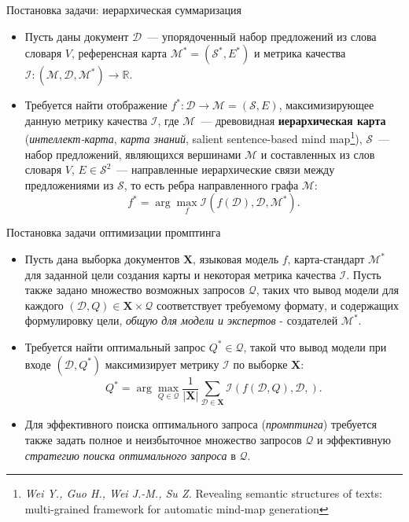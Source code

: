\documentclass{beamer}
\newcommand{\Q}{\mathcal{Q}}
\newcommand{\D}{\mathcal{D}}
\renewcommand{\S}{\mathcal{S}}
\newcommand{\X}{\mathbf{X}}
\newcommand{\I}{\mathcal{I}}
\newcommand{\M}{\mathcal{M}}
\newcommand{\R}{\mathbb{R}}
\begin{document}

\begin{frame}{Постановка задачи: иерархическая суммаризация}

\begin{itemize}
    \item Пусть даны документ $\D$~--- упорядоченный набор предложений из слова словаря $V$, референсная карта $\M^* = (\S^*, E^*)$ и метрика качества $\I: (\M, \D, \M^*) \rightarrow \R$.
    \item Требуется найти отображение $f^*: \D \rightarrow \M = (\S, E)$, максимизирующее данную метрику качества $\I$, где $\M$~--- древовидная \textbf{иерархическая карта} (\textit{интеллект-карта}, \textit{карта знаний}, salient sentence-based mind map\footnote{
    \emph{Wei Y., Guo H., Wei J.-M., Su Z.} Revealing semantic structures of texts: multi-grained framework for automatic mind-map generation
    }), $\S$~--- набор предложений, являющихся вершинами $\M$ и составленных из слов словаря $V$, $E\in \S^2$~--- направленные иерархические связи между предложениями из $\S$, то есть ребра направленного графа $\M$:
$$
f^* = \arg\max\limits_{f} \I(f(\D), \D, \M^*).
$$
\end{itemize}

\end{frame}


\begin{frame}{Постановка задачи оптимизации промптинга}

\begin{itemize}
    \item Пусть дана выборка документов $\X$, языковая модель $f$, карта-стандарт $\M^*$ для заданной цели создания карты и некоторая метрика качества $\I$. Пусть также задано множество возможных запросов $\Q$, таких что вывод модели для каждого $(\D, Q)\in\X\times\Q$ соответствует требуемому формату, и содержащих формулировку цели, \textit{общую для модели и экспертов} - создателей $\M^*$.
    \item Требуется найти оптимальный запрос $Q^*\in\Q$, такой что вывод модели при входе $(\D, Q^*)$ максимизирует метрику $\I$ по выборке $\X$:
    $$
    Q^* = \arg\max\limits_{Q\in\Q} \frac{1}{|\X|}\sum\limits_{\D\in\X} \I(f(\D, Q), \D, ).
    $$
    \item Для эффективного поиска оптимального запроса (\textit{промптинга}) требуется также задать полное и неизбыточное множество запросов $\Q$ и эффективную \textit{стратегию поиска оптимального запроса} в $\Q$.
\end{itemize}

\end{frame}
\end{document}
